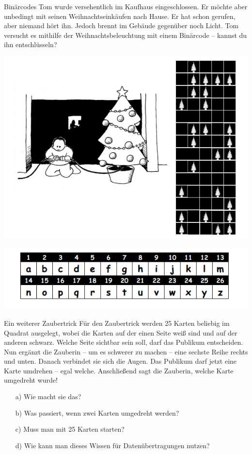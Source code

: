 \documentclass{../../../zirkelblatt}
\begin{document}
\begin{aufgabe}{Binärcodes}
Tom wurde versehentlich im Kaufhaus eingeschlossen.
Er möchte aber unbedingt mit seinen Weihnachtseinkäufen nach Hause.
Er hat schon gerufen, aber niemand hört ihn. Jedoch brennt im Gebäude gegenüber noch Licht.
Tom versucht es mithilfe der Weihnachtsbeleuchtung mit einem Binärcode -- kannst du ihn entschlüsseln?
\begin{center}\includegraphics[scale=0.6]{binaercode1.png}\end{center}
\begin{center}\includegraphics[scale=0.6]{binaercode2.png}\end{center}
\end{aufgabe}

\begin{aufgabe}{Ein weiterer Zaubertrick}
Für den Zaubertrick werden 25 Karten beliebig im Quadrat ausgelegt, wobei die Karten auf der einen Seite weiß sind und auf der anderen schwarz.
Welche Seite sichtbar sein soll, darf das Publikum entscheiden.
Nun ergänzt die Zauberin -- um es schwerer zu machen -- eine sechste Reihe rechts und unten.
Danach verbindet sie sich die Augen.
Das Publikum darf jetzt eine Karte umdrehen -- egal welche.
Anschließend sagt die Zauberin, welche Karte umgedreht wurde!
\begin{itemize}
\item[a)] Wie macht sie das?
\item[b)] Was passiert, wenn zwei Karten umgedreht werden?
\item[c)] Muss man mit 25 Karten starten?
\item[d)] Wie kann man dieses Wissen für Datenübertragungen nutzen?
\end{itemize}
\end{aufgabe}
\end{document}
